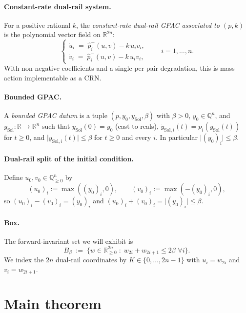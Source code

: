\documentclass[11pt]{article}
\newcommand{\R}{\mathbb{R}}
\newcommand{\Q}{\mathbb{Q}}
\newcommand{\abs}[1]{\lvert #1 \rvert}
\begin{document}
\paragraph{Constant-rate dual-rail system.}
For a positive rational $k$, the \emph{constant-rate dual-rail
GPAC associated to $(p, k)$} is the polynomial vector field on
$\R^{2n}$:
\begin{equation}\label{eq:dr-system}
  \begin{cases}
    \dot u_i \;=\; \widehat{p}_i^{+}(u, v) - k\, u_i v_i, \\
    \dot v_i \;=\; \widehat{p}_i^{-}(u, v) - k\, u_i v_i,
  \end{cases}
  \qquad
  i = 1, \dots, n.
\end{equation}
With non-negative coefficients and a single per-pair degradation, this
is mass-action implementable as a CRN.

\paragraph{Bounded GPAC.}
A \emph{bounded GPAC datum} is a tuple
$(p, y_0, y_{\mathrm{Sol}}, \beta)$ with $\beta > 0$,
$y_0 \in \Q^n$, and $y_{\mathrm{Sol}}\colon \R \to \R^n$ such that
$y_{\mathrm{Sol}}(0) = y_0$ (cast to reals),
$\dot y_{\mathrm{Sol}, i}(t) = p_i(y_{\mathrm{Sol}}(t))$ for $t \ge 0$,
and $\abs{y_{\mathrm{Sol}, i}(t)} \le \beta$ for $t \ge 0$ and every
$i$.  In particular $\abs{(y_0)_i} \le \beta$.

\paragraph{Dual-rail split of the initial condition.}
Define $u_0, v_0 \in \Q_{\ge 0}^n$ by
\[
  (u_0)_i := \max((y_0)_i, 0), \qquad
  (v_0)_i := \max(-(y_0)_i, 0),
\]
so $(u_0)_i - (v_0)_i = (y_0)_i$ and
$(u_0)_i + (v_0)_i = \abs{(y_0)_i} \le \beta$.

\paragraph{Box.}
The forward-invariant set we will exhibit is
\[
  B_\beta \;:=\; \bigl\{ w \in \R^{2n}_{\ge 0}\;:\;
                  w_{2i} + w_{2i+1} \le 2\beta\,\,\forall i \bigr\}.
\]
We index the $2n$ dual-rail coordinates by $K \in \{0, \dots, 2n-1\}$
with $u_i = w_{2i}$ and $v_i = w_{2i+1}$.

\section{Main theorem}
\end{document}
